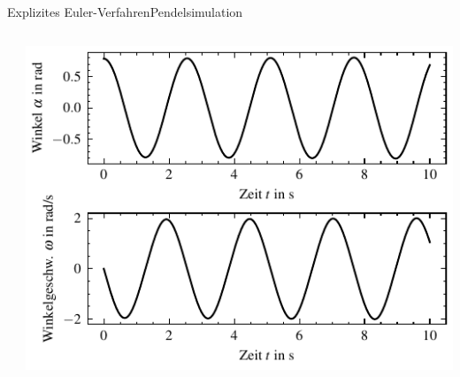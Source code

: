 \documentclass[xelatex,aspectratio=169]{beamer}
\begin{document}
\begin{frame}{Explizites Euler-Verfahren}{Pendelsimulation}
    \begin{columns}
        \begin{column}{0.5\textwidth}
            \inputminted[firstline=10, lastline=21]{python}{src/sim_pendel.py}
        \end{column}
        \begin{column}{0.5\textwidth}
            \includegraphics[width=\textwidth]{fig/sim_pendel.pdf}
        \end{column}
    \end{columns}
\end{frame}
\end{document}
